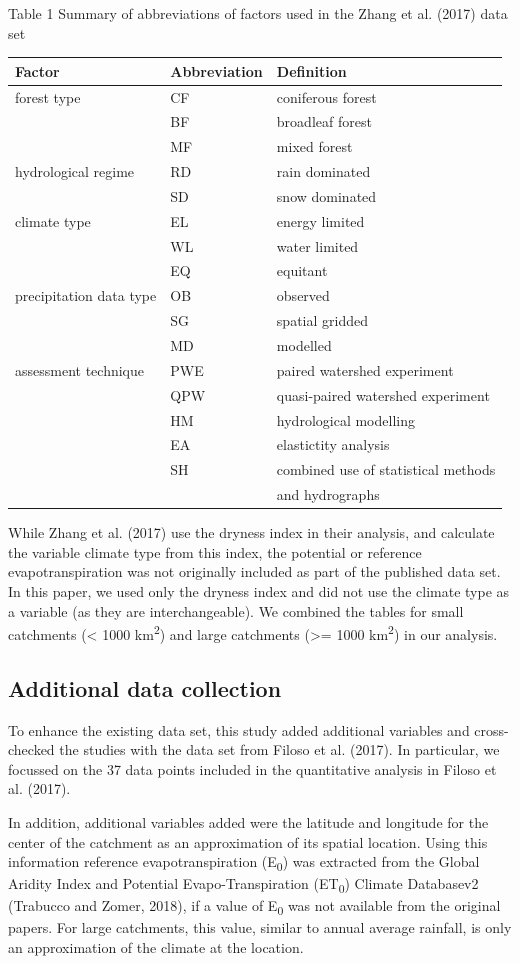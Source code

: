 \documentclass[]{elsarticle} %
\begin{document}
Table 1 Summary of abbreviations of factors used in the Zhang et al. (2017) data set

\begin{longtable}[]{@{}lll@{}}
\toprule
Factor & Abbreviation & Definition\tabularnewline
\midrule
\endhead
forest type & CF & coniferous forest\tabularnewline
& BF & broadleaf forest\tabularnewline
& MF & mixed forest\tabularnewline
hydrological regime & RD & rain dominated\tabularnewline
& SD & snow dominated\tabularnewline
climate type & EL & energy limited\tabularnewline
& WL & water limited\tabularnewline
& EQ & equitant\tabularnewline
precipitation data type & OB & observed\tabularnewline
& SG & spatial gridded\tabularnewline
& MD & modelled\tabularnewline
assessment technique & PWE & paired watershed experiment\tabularnewline
& QPW & quasi-paired watershed experiment\tabularnewline
& HM & hydrological modelling\tabularnewline
& EA & elastictity analysis\tabularnewline
& SH & combined use of statistical methods\tabularnewline
& & and hydrographs\tabularnewline
\bottomrule
\end{longtable}

While Zhang et al. (2017) use the dryness index in their analysis, and calculate the variable climate type from this index, the potential or reference evapotranspiration was not originally included as part of the published data set. In this paper, we used only the dryness index and did not use the climate type as a variable (as they are interchangeable).
We combined the tables for small catchments (\textless{} 1000 km\textsuperscript{2}) and large catchments (\textgreater= 1000 km\textsuperscript{2}) in our analysis.

\hypertarget{additional-data-collection}{%
\subsection{Additional data collection}\label{additional-data-collection}}

To enhance the existing data set, this study added additional variables and cross-checked the studies with the data set from Filoso et al. (2017). In particular, we focussed on the 37 data points included in the quantitative analysis in Filoso et al. (2017).

In addition, additional variables added were the latitude and longitude for the center of the catchment as an approximation of its spatial location. Using this information reference evapotranspiration (E\textsubscript{0}) was extracted from the Global Aridity Index and Potential Evapo-Transpiration (ET\textsubscript{0}) Climate Databasev2 (Trabucco and Zomer, 2018), if a value of E\textsubscript{0} was not available from the original papers. For large catchments, this value, similar to annual average rainfall, is only an approximation of the climate at the location.
\end{document}
